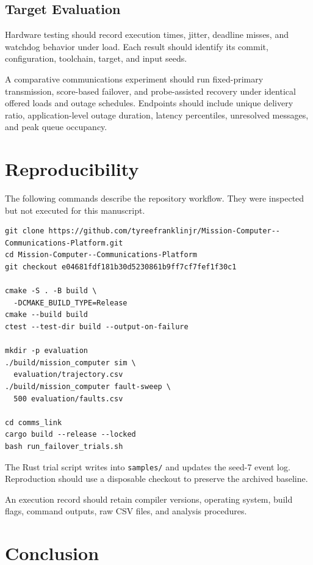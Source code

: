 \documentclass[conference]{IEEEtran}
\begin{document}
\subsection{Target Evaluation}

Hardware testing should record execution times, jitter,
deadline misses, and watchdog behavior under load.
Each result should identify its commit, configuration,
toolchain, target, and input seeds.

A comparative communications experiment should run
fixed-primary transmission, score-based failover, and
probe-assisted recovery under identical offered loads
and outage schedules. Endpoints should include unique
delivery ratio, application-level outage duration,
latency percentiles, unresolved messages, and peak
queue occupancy.

\section{Reproducibility}

The following commands describe the repository workflow.
They were inspected but not executed for this manuscript.

\begin{lstlisting}
git clone https://github.com/tyreefranklinjr/Mission-Computer--Communications-Platform.git
cd Mission-Computer--Communications-Platform
git checkout e04681fdf181b30d5230861b9ff7cf7fef1f30c1

cmake -S . -B build \
  -DCMAKE_BUILD_TYPE=Release
cmake --build build
ctest --test-dir build --output-on-failure

mkdir -p evaluation
./build/mission_computer sim \
  evaluation/trajectory.csv
./build/mission_computer fault-sweep \
  500 evaluation/faults.csv

cd comms_link
cargo build --release --locked
bash run_failover_trials.sh
\end{lstlisting}

The Rust trial script writes into \texttt{samples/}
and updates the seed-7 event log. Reproduction should
use a disposable checkout to preserve the archived
baseline.

An execution record should retain compiler versions,
operating system, build flags, command outputs,
raw CSV files, and analysis procedures.

\section{Conclusion}
\end{document}
